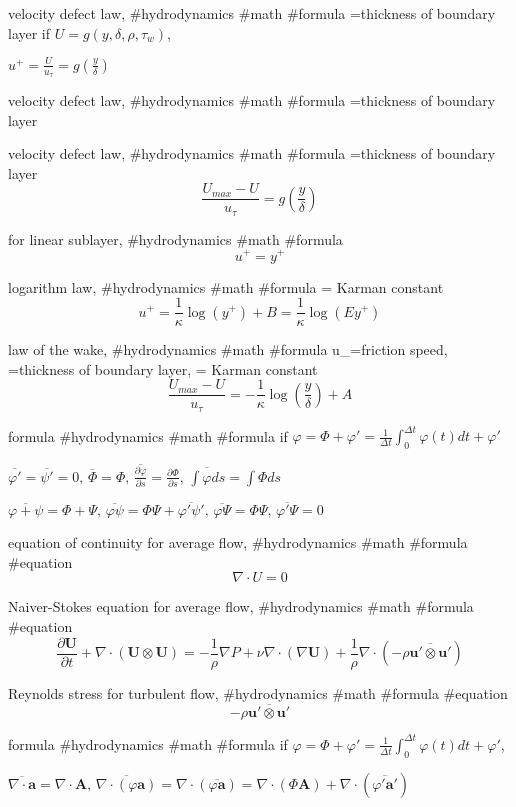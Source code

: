 velocity defect law, #hydrodynamics #math #formula
\delta=thickness of boundary layer
if $U=g(y,\delta,\rho,\tau_w)$,

$u^+=\frac{U}{u_\tau}=g\left(\frac{y}{\delta}\right)$

velocity defect law, #hydrodynamics #math #formula
\delta=thickness of boundary layer

velocity defect law, #hydrodynamics #math #formula
\delta=thickness of boundary layer
$$
\frac{U_{max}-U}{u_\tau}=g\left(\frac{y}{\delta}\right)
$$

for linear sublayer, #hydrodynamics #math #formula
$$
u^+=y^+
$$

logarithm law, #hydrodynamics #math #formula
\kappa= Karman constant
$$
u^+=\frac{1}{\kappa}\log(y^+)+B=\frac{1}{\kappa}\log(E y^+)
$$

law of the wake, #hydrodynamics #math #formula
u_\tau=friction speed, \delta=thickness of boundary layer, \kappa= Karman constant
$$
\frac{U_{max}-U}{u_\tau}=-\frac{1}{\kappa}\log\left(\frac{y}{\delta}\right)+A
$$

formula #hydrodynamics #math #formula
if $\varphi=\Phi+\varphi'=\frac{1}{\Delta t}\int^{\Delta t}_0 \varphi(t)dt+\varphi'$

$
\overline{\varphi'}=\overline{\psi'}=0, \, \overline{\Phi}=\Phi, \, \overline{\frac{\partial \varphi}{\partial s}}=\frac{\partial \Phi}{\partial s},\, \overline{\int\varphi ds}=\int\Phi ds
$

$
\overline{\varphi+\psi}=\Phi+\Psi, \, \overline{\varphi\psi}=\Phi\Psi+\overline{\varphi'\psi'}, \, \overline{\varphi\Psi}=\Phi\Psi, \, \overline{\varphi'\Psi}=0
$

equation of continuity for average flow, #hydrodynamics #math #formula #equation
$$
\nabla \cdot U=0
$$

Naiver-Stokes equation for average flow, #hydrodynamics #math #formula #equation
$$
\frac{\partial {\boldsymbol U}}{\partial t}+\nabla\cdot({\boldsymbol U}\otimes{\boldsymbol U})=-\frac{1}{\rho}\nabla P+\nu \nabla\cdot(\nabla {\boldsymbol U})+\frac{1}{\rho}\nabla\cdot(-\rho \overline{{\boldsymbol u}' \otimes {\boldsymbol u}'})
$$

Reynolds stress for turbulent flow, #hydrodynamics #math #formula #equation
$$
-\rho \overline{{\boldsymbol u}' \otimes {\boldsymbol u}'}
$$

formula #hydrodynamics #math #formula
if $\varphi=\Phi+\varphi'=\frac{1}{\Delta t}\int^{\Delta t}_0 \varphi(t)dt+\varphi'$,

$
\overline{\nabla\cdot {\boldsymbol a}}=\nabla\cdot {\boldsymbol A}, \, \overline{\nabla\cdot (\varphi{\boldsymbol a})}=\nabla\cdot (\overline{\varphi{\boldsymbol a}})=\nabla\cdot(\Phi{\boldsymbol A})+\nabla\cdot (\overline{\varphi'{\boldsymbol a}'})
$

